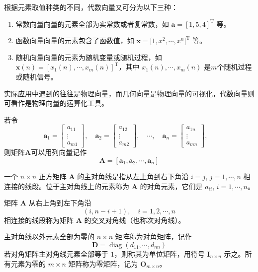 \documentclass[punct=kaiming, fontset=fandol]{ctexbook}
\numberwithin{equation}{section}
\theoremstyle{mystyle}
\def\TT{\symsfup{T}}
\def\bf#1{\symbfit{#1}}
\def\TT{\mathrm{T}}
\def\bf#1{\bm{#1}}
\def\hccwd{\hspace*{\ccwd}}
\DeclareMathOperator{\diag}{diag}
\begin{document}
  根据元素取值种类的不同，代数向量又可分为以下三种：
  \begin{enumerate}
    \item {\fangsong 常数向量}\hccwd 向量的元素全部为实常数或者复常数，如 $\bf{a}=[1,\allowbreak 5,\allowbreak 4]^{\TT}$ 等。
    \item {\fangsong 函数向量}\hccwd 向量的元素包含了函数值，如 $\bf{x} = \bigl[ 1,\allowbreak x^2,\allowbreak\cdots,\allowbreak x^n \bigr]^{\TT}$ 等。
    \item {\fangsong 随机向量}\hccwd 向量的元素为随机变量或随机过程，如 $\bf{x}(n) = [x_1(n),\allowbreak \cdots,\allowbreak x_m(n)]^{\TT}$，其中 $x_1(n),\allowbreak\cdots,\allowbreak x_m(n)$ 是$m$个随机过程或随机信号。
  \end{enumerate}

  实际应用中遇到的往往是物理向量，而几何向量是物理向量的可视化，代数向量则可看作是物理向量的运算化工具。

  若令
  \begin{equation}
    \bf{a}_1 = \begin{bmatrix}
      a_{11} \\ \vdots \\ a_{m1}
    \end{bmatrix},\quad
    \bf{a}_2 = \begin{bmatrix}
      a_{12} \\ \vdots \\ a_{m2}
    \end{bmatrix},\quad
    \cdots,\quad
    \bf{a}_n = \begin{bmatrix}
      a_{1n} \\ \vdots \\ a_{mn}
    \end{bmatrix},\quad
  \end{equation}
  则矩阵$\bf A$可以用列向量记作
  \begin{equation}
    \bf A = [\bf{a}_1,\bf{a}_2,\cdots,\bf{a}_n]
  \end{equation}

  一个 $n\times n$ 正方矩阵 $\bf A$ 的主对角线是指从左上角到右下角沿 $i=j$, $j=1,\allowbreak \cdots,\allowbreak n$ 相连接的线段。位于主对角线上的元素称为 $\bf A$ 的对角元素，它们是 $a_{ii}$, $i=1,\allowbreak\cdots,\allowbreak n$。

  矩阵 $\bf A$ 从右上角到左下角沿
  \[ (i,n-i+1),\quad i=1,2,\cdots,n \]
  相连接的线段称为矩阵 $\bf A$ 的交叉对角线（也称次对角线）。

  主对角线以外元素全部为零的 $n\times n$ 矩阵称为对角矩阵，记作
  \begin{equation}
    \bf{D} = \diag(d_{11},\cdots,d_{nn})
  \end{equation}
  若对角矩阵主对角线元素全部等于 $1$，则称其为单位矩阵，用符号 $\bf{I}_{n \times n}$ 示之。所有元素为零的 $m\times n$ 矩阵称为零矩阵，记为 $\bf{O}_{m \times n}$。
\end{document}

